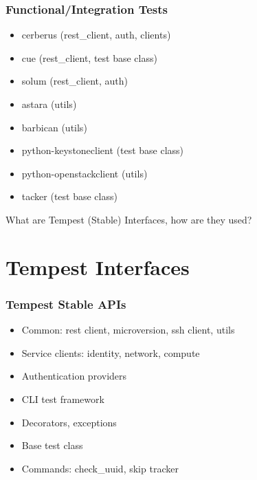 \documentclass[aspectratio=169,11pt,hyperref={colorlinks=true}]{beamer}
\begin{document}
\begin{frame}
    \frametitle{Functional/Integration Tests}
    \begin{itemize}
        \item{cerberus (rest\_client, auth, clients)}
        \item{cue (rest\_client, test base class)}
        \item{solum (rest\_client, auth)}
    \end{itemize}
    \begin{itemize}
        \item{astara (utils)}
        \item{barbican (utils)}
        \item{python-keystoneclient (test base class)}
        \item{python-openstackclient (utils)}
        \item{tacker (test base class)}
    \end{itemize}
\end{frame}

\begin{frame}[c]
    \begin{center}
        \large What are Tempest (Stable) Interfaces, how are they used?
    \end{center}
\end{frame}

\section{Tempest Interfaces}
\begin{frame}
    \frametitle{Tempest Stable APIs}
    \begin{itemize}
        \item{Common: rest client, microversion, ssh client, utils}
        \item{Service clients: identity, network, compute}
        \item{Authentication providers}
        \item{CLI test framework}
        \item{Decorators, exceptions}
        \item{Base test class}
        \item{Commands: check\_uuid, skip tracker}
    \end{itemize}
\end{frame}
\end{document}
